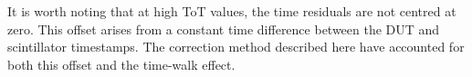 It is worth noting that at high ToT values, the time residuals are not centred at zero. This offset arises from a constant time difference between the DUT and scintillator timestamps. The correction method described here have accounted for both this offset and the time-walk effect.

